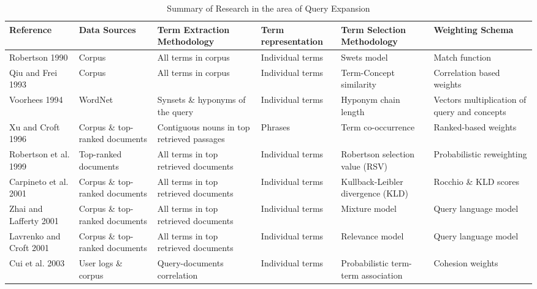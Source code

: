 \begin{landscape}
	\begin{table}
		\centering
		
		\caption{Summary of Research in the area of Query Expansion \label{tab:8}}{
			
			\begin{tabular}{ | M{3cm} | M{3cm} | M{3.2cm} | M{3cm} | M{3cm} | M{3cm} |}
				\hline 
				
				\textbf{Reference} & \textbf{Data Sources} & \textbf{Term Extraction Methodology} & \textbf{Term representation} & \textbf{Term Selection Methodology} & \textbf{Weighting Schema} \\ \hline 
				Robertson 1990 \cite{robertson1990term} & Corpus & All terms in corpus & Individual terms & Swets model & Match function   \\ \hline
				Qiu and Frei 1993 \cite{qiu1993concept} & Corpus & All terms in corpus & Individual terms & Term-Concept similarity & Correlation based weights  \\ \hline
				Voorhees 1994 \cite{voorhees1994query} & WordNet & Synsets \& hyponyms of the query & Individual terms & Hyponym chain length & Vectors multiplication of query and concepts \\ \hline
				Xu and Croft 1996 \cite{xu1996query} & Corpus \& top-ranked documents & Contiguous nouns in top retrieved passages  &  Phrases & Term co-occurrence & Ranked-based weights \\ \hline
				Robertson et al. 1999 \cite{robertson1999okapi} & Top-ranked documents  & All terms in top retrieved documents & Individual terms & Robertson selection value (RSV) & Probabilistic reweighting \\ \hline
				Carpineto et al. 2001 \cite{carpineto2001information} & Corpus \& top-ranked documents & All terms in top retrieved documents  & Individual terms & Kullback-Leibler divergence (KLD) & Rocchio \& KLD scores \\ \hline
				Zhai and Lafferty 2001 \cite{zhai2001model} & Corpus \& top-ranked documents & All terms in top retrieved documents  & Individual terms & Mixture model & Query language model \\ \hline
				Lavrenko and Croft 2001 \cite{lavrenko2001relevance} & Corpus \& top-ranked documents  & All terms in top retrieved documents  & Individual terms & Relevance model & Query language model \\ \hline
				Cui et al. 2003 \cite{cui2003query} & User logs \& corpus & Query-documents correlation  & Individual terms & Probabilistic term-term association & Cohesion weights \\ \hline

\end{tabular}}
\end{table}
\end{landscape}
